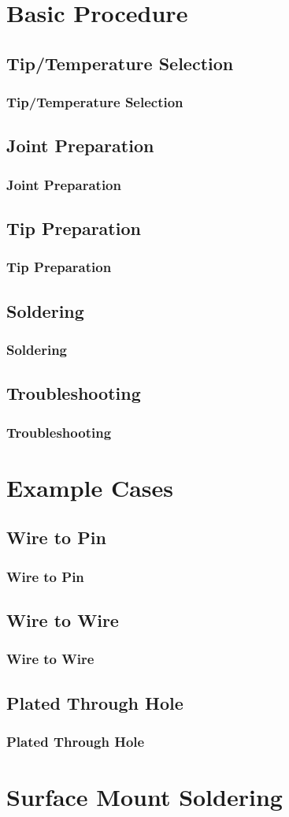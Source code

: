 \documentclass{beamer}
\begin{document}
\section{Basic Procedure}
\subsection{Tip/Temperature Selection}
\begin{frame}[t]
	\frametitle{Tip/Temperature Selection}
\end{frame}

\subsection{Joint Preparation}
\begin{frame}[t]
	\frametitle{Joint Preparation}
\end{frame}

\subsection{Tip Preparation}
\begin{frame}[t]
	\frametitle{Tip Preparation}
\end{frame}

\subsection{Soldering}
\begin{frame}[t]
	\frametitle{Soldering}
\end{frame}

\subsection{Troubleshooting}
\begin{frame}[t]
	\frametitle{Troubleshooting}
\end{frame}

\section{Example Cases}
\subsection{Wire to Pin}
\begin{frame}[t]
	\frametitle{Wire to Pin}
\end{frame}

\subsection{Wire to Wire}
\begin{frame}[t]
	\frametitle{Wire to Wire}
\end{frame}

\subsection{Plated Through Hole}
\begin{frame}[t]
	\frametitle{Plated Through Hole}
\end{frame}

\section{Surface Mount Soldering}
\end{document}
